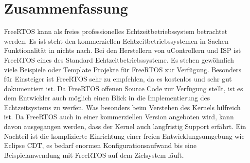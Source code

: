 \section{Zusammenfassung}
FreeRTOS kann als freies professionelles Echtzeitbetriebssystem betrachtet werden. Es ist steht den kommerziellen Echtzeitbetriebssystemen in Sachen Funktionalität in nichts nach. Bei den Herstellern von uControllern und ISP ist FreeRTOS eines des Standard Echtzeitbetriebssysteme. Es stehen gewöhnlich viele Beispiele oder Template Projekte für FreeRTOS zur Verfügung.  Besonders für Einsteiger ist FreeRTOS sehr zu empfehlen, da es kostenlos und sehr gut dokumentiert ist. Da FreeRTOS offenen Source Code zur Verfügung stellt, ist es dem Entwickler auch möglich einen Blick in die Implementierung des Echtzeitsystems zu werfen. Was besonders beim Verstehen des Kernels hilfreich ist. Da FreeRTOS auch in einer kommerziellen Version angeboten wird, kann davon ausgegangen werden, dass der Kernel auch langfristig Support erfährt. Ein Nachteil ist die komplizierte Einrichtung einer freien Entwicklungsumgebung wie Eclipse CDT, es bedarf enormen Konfigurationsaufwand bis eine Beispielanwendung mit FreeRTOS auf dem Zielsystem läuft.    